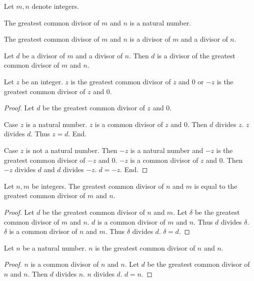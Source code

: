 \documentclass{article}
\begin{document}
\begin{forthel}

Let $m,n$ denote integers.


\begin{signature}
The greatest common divisor of $m$ and $n$ is a natural number.
\end{signature}

\begin{axiom}
The greatest common divisor of $m$ and $n$ is a divisor of $m$ and a divisor of $n$.
\end{axiom}

\begin{axiom}
Let $d$ be a divisor of $m$ and a divisor of $n$.
Then $d$ is a divisor of the greatest common divisor of $m$ and $n$.
\end{axiom}


\begin{lemma}
Let $z$ be an integer.
$z$ is the greatest common divisor of $z$ and $0$ or $-z$ is the greatest common divisor of $z$ and $0$.
\end{lemma}
\begin{proof}
Let $d$ be the greatest common divisor of $z$ and $0$.

Case $z$ is a natural number. $z$ is a common divisor of $z$ and $0$.
  Then $d$ divides $z$. $z$ divides $d$. Thus $z = d$. End.

Case $z$ is not a natural number. Then $-z$ is a natural number and $-z$ is the greatest common divisor of $-z$ and $0$.
  $-z$ is a common divisor of $z$ and $0$. Then $-z$ divides $d$ and $d$ divides $-z$. $d = -z$.
End.
\end{proof}


\begin{lemma}
Let $n,m$ be integers. The greatest common divisor of $n$ and $m$ is equal to
the greatest common divisor of $m$ and $n$.
\end{lemma}
\begin{proof}
Let $d$ be the greatest common divisor of $n$ and $m$.
Let $\delta$ be the greatest common divisor of $m$ and $n$.
$d$ is a common divisor of $m$ and $n$. Thus $d$ divides $\delta$.
$\delta$ is a common divisor of $n$ and $m$. Thus $\delta$ divides $d$. $\delta = d$.
\end{proof}

\begin{lemma}
Let $n$ be a natural number.
$n$ is the greatest common divisor of $n$ and $n$.
\end{lemma}
\begin{proof}
$n$ is a common divisor of $n$ and $n$. Let $d$ be the greatest common divisor of $n$ and $n$.
Then $d$ divides $n$. $n$ divides $d$. $d = n$.
\end{proof}

\end{forthel}
\end{document}
